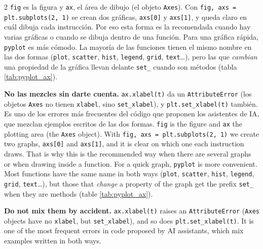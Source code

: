 \begin{paracol}{2}
\texttt{fig} es la figura y \texttt{ax}, el área de dibujo (el objeto \texttt{Axes}). Con \texttt{fig, axs = plt.subplots(2, 1)} se crean dos gráficas, \texttt{axs[0]} y \texttt{axs[1]}, y queda claro en cuál dibuja cada instrucción. Por eso esta forma es la recomendada cuando hay varias gráficas o cuando se dibuja dentro de una función. Para una gráfica rápida, \texttt{pyplot} es más cómodo. La mayoría de las funciones tienen el mismo nombre en las dos formas (\texttt{plot}, \texttt{scatter}, \texttt{hist}, \texttt{legend}, \texttt{grid}, \texttt{text}…), pero las que \emph{cambian} una propiedad de la gráfica llevan delante \texttt{set\_} cuando son métodos (tabla \ref{tab:pyplot_ax}).

\textbf{No las mezcles sin darte cuenta.} \texttt{ax.xlabel(\textquotesingle{}t\textquotesingle{})} da un \texttt{AttributeError} (los objetos \texttt{Axes} no tienen \texttt{xlabel}, sino \texttt{set\_xlabel}), y \texttt{plt.set\_xlabel(\textquotesingle{}t\textquotesingle{})} también. Es uno de los errores más frecuentes del código que proponen los asistentes de IA, que mezclan ejemplos escritos de las dos formas.
\switchcolumn
\texttt{fig} is the figure and \texttt{ax} the plotting area (the \texttt{Axes} object). With \texttt{fig, axs = plt.subplots(2, 1)} we create two graphs, \texttt{axs[0]} and \texttt{axs[1]}, and it is clear on which one each instruction draws. That is why this is the recommended way when there are several graphs or when drawing inside a function. For a quick graph, \texttt{pyplot} is more convenient. Most functions have the same name in both ways (\texttt{plot}, \texttt{scatter}, \texttt{hist}, \texttt{legend}, \texttt{grid}, \texttt{text}…), but those that \emph{change} a property of the graph get the prefix \texttt{set\_} when they are methods (table \ref{tab:pyplot_ax}).

\textbf{Do not mix them by accident.} \texttt{ax.xlabel(\textquotesingle{}t\textquotesingle{})} raises an \texttt{AttributeError} (\texttt{Axes} objects have no \texttt{xlabel}, but \texttt{set\_xlabel}), and so does \texttt{plt.set\_xlabel(\textquotesingle{}t\textquotesingle{})}. It is one of the most frequent errors in code proposed by AI assistants, which mix examples written in both ways.
\end{paracol}

